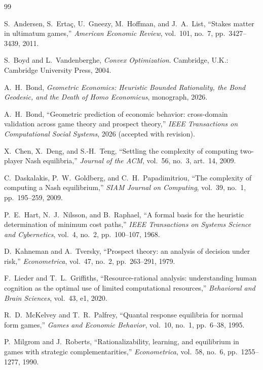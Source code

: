 \documentclass[11pt]{article}
\theoremstyle{definition}
\theoremstyle{remark}
\begin{document}
\begin{thebibliography}{99}

S.~Andersen, S.~Erta\c{c}, U.~Gneezy, M.~Hoffman, and J.~A.~List, ``Stakes matter in ultimatum games,''
\emph{American Economic Review}, vol.~101, no.~7, pp.~3427--3439, 2011.

S.~Boyd and L.~Vandenberghe, \emph{Convex Optimization}.
Cambridge, U.K.: Cambridge University Press, 2004.

A.~H.~Bond, \emph{Geometric Economics: Heuristic Bounded Rationality, the Bond Geodesic, and the
Death of Homo Economicus}, monograph, 2026.

A.~H.~Bond, ``Geometric prediction of economic behavior: cross-domain validation across game theory
and prospect theory,'' \emph{IEEE Transactions on Computational Social Systems}, 2026 (accepted with
revision).

X.~Chen, X.~Deng, and S.-H.~Teng, ``Settling the complexity of computing two-player Nash equilibria,''
\emph{Journal of the ACM}, vol.~56, no.~3, art.~14, 2009.

C.~Daskalakis, P.~W.~Goldberg, and C.~H.~Papadimitriou, ``The complexity of computing a Nash
equilibrium,'' \emph{SIAM Journal on Computing}, vol.~39, no.~1, pp.~195--259, 2009.

P.~E.~Hart, N.~J.~Nilsson, and B.~Raphael, ``A formal basis for the heuristic determination of
minimum cost paths,'' \emph{IEEE Transactions on Systems Science and Cybernetics}, vol.~4, no.~2,
pp.~100--107, 1968.

D.~Kahneman and A.~Tversky, ``Prospect theory: an analysis of decision under risk,''
\emph{Econometrica}, vol.~47, no.~2, pp.~263--291, 1979.

F.~Lieder and T.~L.~Griffiths, ``Resource-rational analysis: understanding human cognition as the
optimal use of limited computational resources,''
\emph{Behavioral and Brain Sciences}, vol.~43, e1, 2020.

R.~D.~McKelvey and T.~R.~Palfrey, ``Quantal response equilibria for normal form games,''
\emph{Games and Economic Behavior}, vol.~10, no.~1, pp.~6--38, 1995.

P.~Milgrom and J.~Roberts, ``Rationalizability, learning, and equilibrium in games with strategic
complementarities,'' \emph{Econometrica}, vol.~58, no.~6, pp.~1255--1277, 1990.


\end{thebibliography}
\end{document}
